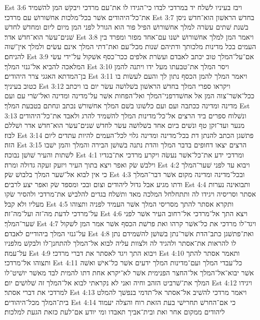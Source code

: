 Est 3:6  ויבז בעיניו לשׁלח יד במרדכי לבדו כי־הגידו לו את־עם מרדכי ויבקשׁ המן להשׁמיד את־כל־היהודים אשׁר בכל־מלכות אחשׁורושׁ עם מרדכי׃
Est 3:7  בחדשׁ הראשׁון הוא־חדשׁ ניסן בשׁנת שׁתים עשׂרה למלך אחשׁורושׁ הפיל פור הוא הגורל לפני המן מיום ליום ומחדשׁ לחדשׁ שׁנים־עשׂר הוא־חדשׁ אדר׃
Est 3:8  ויאמר המן למלך אחשׁורושׁ ישׁנו עם־אחד מפזר ומפרד בין העמים בכל מדינות מלכותך ודתיהם שׁנות מכל־עם ואת־דתי המלך אינם עשׂים ולמלך אין־שׁוה להניחם׃
Est 3:9  אם־על־המלך טוב יכתב לאבדם ועשׂרת אלפים ככר־כסף אשׁקול על־ידי עשׂי המלאכה להביא אל־גנזי המלך׃
Est 3:10  ויסר המלך את־טבעתו מעל ידו ויתנה להמן בן־המדתא האגגי צרר היהודים׃
Est 3:11  ויאמר המלך להמן הכסף נתון לך והעם לעשׂות בו כטוב בעיניך׃
Est 3:12  ויקראו ספרי המלך בחדשׁ הראשׁון בשׁלושׁה עשׂר יום בו ויכתב ככל־אשׁר־צוה המן אל אחשׁדרפני־המלך ואל־הפחות אשׁר על־מדינה ומדינה ואל־שׂרי עם ועם מדינה ומדינה ככתבה ועם ועם כלשׁונו בשׁם המלך אחשׁורשׁ נכתב ונחתם בטבעת המלך׃
Est 3:13  ונשׁלוח ספרים ביד הרצים אל־כל־מדינות המלך להשׁמיד להרג ולאבד את־כל־היהודים מנער ועד־זקן טף ונשׁים ביום אחד בשׁלושׁה עשׂר לחדשׁ שׁנים־עשׂר הוא־חדשׁ אדר ושׁללם לבוז׃
Est 3:14  פתשׁגן הכתב להנתן דת בכל־מדינה ומדינה גלוי לכל־העמים להיות עתדים ליום הזה׃
Est 3:15  הרצים יצאו דחופים בדבר המלך והדת נתנה בשׁושׁן הבירה והמלך והמן ישׁבו לשׁתות והעיר שׁושׁן נבוכה׃
Est 4:1  ומרדכי ידע את־כל־אשׁר נעשׂה ויקרע מרדכי את־בגדיו וילבשׁ שׂק ואפר ויצא בתוך העיר ויזעק זעקה גדולה ומרה׃
Est 4:2  ויבוא עד לפני שׁער־המלך כי אין לבוא אל־שׁער המלך בלבושׁ שׂק׃
Est 4:3  ובכל־מדינה ומדינה מקום אשׁר דבר־המלך ודתו מגיע אבל גדול ליהודים וצום ובכי ומספד שׂק ואפר יצע לרבים׃
Est 4:4  ותבואינה נערות אסתר וסריסיה ויגידו לה ותתחלחל המלכה מאד ותשׁלח בגדים להלבישׁ את־מרדכי ולהסיר שׂקו מעליו ולא קבל׃
Est 4:5  ותקרא אסתר להתך מסריסי המלך אשׁר העמיד לפניה ותצוהו על־מרדכי לדעת מה־זה ועל־מה־זה׃
Est 4:6  ויצא התך אל־מרדכי אל־רחוב העיר אשׁר לפני שׁער־המלך׃
Est 4:7  ויגד־לו מרדכי את כל־אשׁר קרהו ואת פרשׁת הכסף אשׁר אמר המן לשׁקול על־גנזי המלך ביהודיים לאבדם׃
Est 4:8  ואת־פתשׁגן כתב־הדת אשׁר־נתן בשׁושׁן להשׁמידם נתן לו להראות את־אסתר ולהגיד לה ולצוות עליה לבוא אל־המלך להתחנן־לו ולבקשׁ מלפניו על־עמה׃
Est 4:9  ויבוא התך ויגד לאסתר את דברי מרדכי׃
Est 4:10  ותאמר אסתר להתך ותצוהו אל־מרדכי׃
Est 4:11  כל־עבדי המלך ועם־מדינות המלך ידעים אשׁר כל־אישׁ ואשׁה אשׁר יבוא־אל־המלך אל־החצר הפנימית אשׁר לא־יקרא אחת דתו להמית לבד מאשׁר יושׁיט־לו המלך את־שׁרביט הזהב וחיה ואני לא נקראתי לבוא אל־המלך זה שׁלושׁים יום׃
Est 4:12  ויגידו למרדכי את דברי אסתר׃
Est 4:13  ויאמר מרדכי להשׁיב אל־אסתר אל־תדמי בנפשׁך להמלט בית־המלך מכל־היהודים׃
Est 4:14  כי אם־החרשׁ תחרישׁי בעת הזאת רוח והצלה יעמוד ליהודים ממקום אחר ואת ובית־אביך תאבדו ומי יודע אם־לעת כזאת הגעת למלכות׃
